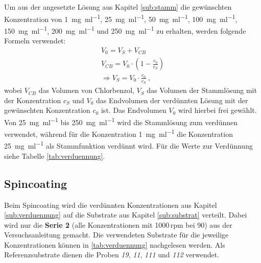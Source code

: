 Um aus der angesetzte Lösung aus Kapitel \ref{sub:stamm} die gewünschten Konzentration von \SI{1}{\milli\gram\per\milli\litre}, \SI{25}{\milli\gram\per\milli\litre}, \SI{50}{\milli\gram\per\milli\litre}, \SI{100}{\milli\gram\per\milli\litre}, \SI{150}{\milli\gram\per\milli\litre}, \SI{200}{\milli\gram\per\milli\litre} und \SI{250}{\milli\gram\per\milli\litre} zu erhalten, werden folgende Formeln verwendet:
\begin{gather}
	V_0 = V_S + V_{CB}\\
	\boxed{V_{CB} = V_0 \cdot \left( 1 - \frac{c_0}{c_S} \right)}\\
	\Rightarrow \boxed{V_S = V_0 \cdot \frac{c_0}{c_S}}~,
	\label{eq:vol}
\end{gather}
wobei $V_{CB}$ das Volumen von Chlorbenzol, $V_S$ das Volumen der Stammlösung mit der Konzentration $c_S$ und $V_0$ das Endvolumen der verdünnten Lösung mit der gewünschten Konzentration $c_0$ ist. Das Endvolumen $V_0$ wird hierbei frei gewählt. Von \SI{25}{\milli\gram\per\milli\litre} bis \SI{250}{\milli\gram\per\milli\litre} wird die Stammlösung zum verdünnen verwendet, während für die Konzentration \SI{1}{\milli\gram\per\milli\litre} die Konzentration \SI{25}{\milli\gram\per\milli\litre} als Stammfunktion verdünnt wird. Für die Werte zur Verdünnung siehe Tabelle \ref{tab:verduennung}.

\subsection{Spincoating}
\label{sub:spin}

Beim Spincoating wird die verdünnten Konzentrationen aus Kapitel \ref{sub:verduennung} auf die Substrate aus Kapitel \ref{sub:substrat} verteilt. Dabei wird nur die \textbf{Serie 2} (alle Konzentrationen mit 1000\,rpm bei \SI{90}{\sec}) aus der Versuchsanleitung gemacht. Die verwendeten Substrate für die jeweilige Konzentrationen können in \ref{tab:verduennung} nachgelesen werden. Als Referenzsubstrate dienen die Proben \textit{19}, \textit{11}, \textit{111} und \textit{112} verwendet.


